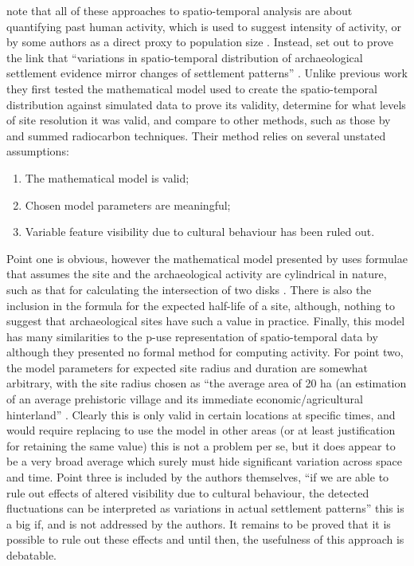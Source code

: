 \citet{Demjn2016100} note that all of these approaches to spatio-temporal analysis are about quantifying past human activity, which is used to suggest intensity of activity, or by some authors as a direct proxy to population size \citep[100]{Demjn2016100}. Instead, \citet{Demjn2016100} set out to prove the link that ``variations in spatio-temporal distribution of archaeological settlement evidence mirror changes of settlement patterns'' \citep[102]{Demjn2016100}. Unlike previous work they first tested the mathematical model used to create the spatio-temporal distribution against simulated data to prove its validity, determine for what levels of site resolution it was valid, and compare to other methods, such as those by \citet{ARCM:ARCM578} and summed radiocarbon techniques. Their method relies on several unstated assumptions:
\begin{enumerate}
\item The mathematical model is valid;
\item Chosen model parameters are meaningful;
\item Variable feature visibility due to cultural behaviour has been ruled out.
\end{enumerate}

Point one is obvious, however the mathematical model presented by \citet{Demjn2016100} uses formulae that assumes the site and the archaeological activity are cylindrical in nature, such as that for calculating the intersection of two disks \citep[103]{Demjn2016100}. There is also the inclusion in the formula for the expected half-life of a site, although, nothing to suggest that archaeological sites have such a value in practice. Finally, this model has many similarities to the p-use representation of spatio-temporal data by \citet{Lock:1997vn} although they presented no formal method for computing activity. For point two, the model parameters for expected site radius and duration are somewhat arbitrary, with the site radius chosen as ``the average area of 20 ha (an estimation of an average prehistoric village and its immediate economic/agricultural hinterland'' \citep[104]{Demjn2016100}. Clearly this is only valid in certain locations at specific times, and would require replacing to use the model in other areas (or at least justification for retaining the same value) this is not a problem per se, but it does appear to be a very broad average which surely must hide significant variation across space and time. Point three is included by the authors themselves, ``if we are able to rule out effects of altered visibility due to cultural behaviour, the detected fluctuations can be interpreted as variations in actual settlement patterns'' \citep[106]{Demjn2016100} this is a big if, and is not addressed by the authors. It remains to be proved that it is possible to rule out these effects and until then, the usefulness of this approach is debatable.

